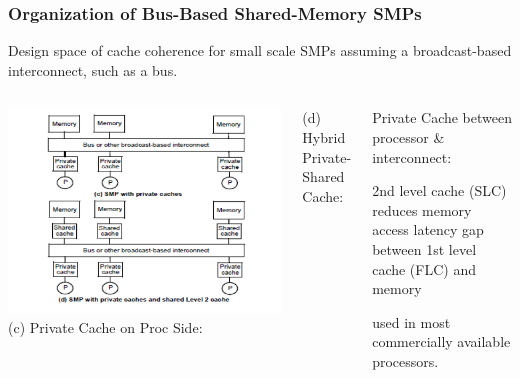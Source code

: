 \documentclass{beamer}
\renewcommand{\emph}[1]{\textcolor{structure}{#1}}
\newcommand{\emp}[1]{\textcolor{DikuRed}{ #1}}
\begin{document}
\begin{frame}[fragile,t]
\frametitle{Organization of Bus-Based Shared-Memory SMPs}

Design space of cache coherence for small scale SMPs 
assuming a broadcast-based interconnect, such as a bus.

\begin{columns}\hspace{-10ex}
\includegraphics[width=50ex]{Figures/FigsInfCoherence/PrivCachSMP}
\pause
        \emp{(c) Private Cache on Proc Side}:
\bigskip
\bigskip
\bigskip

        \emph{(d) Hybrid Private-Shared Cache}:
        \begin{itemize}
        \begin{scriptsize}
            \item \emp{Private Cache} between processor \& interconnect:
            \item 2nd level cache (SLC) reduces memory access latency gap
                    between 1st level cache (FLC) and memory
            \item used in most commercially available processors.
        \end {scriptsize}
        \end  {itemize}
\end{columns}

\end{frame}
\end{document}
